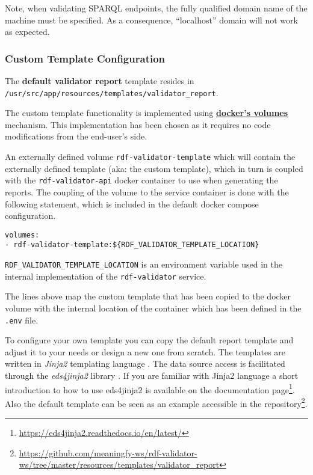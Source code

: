 	Note, when validating SPARQL endpoints, the fully qualified domain name of the machine must be specified. As a consequence, ``localhost'' domain will not work as expected.

	\subsubsection{Custom Template Configuration}
	The \textbf{default validator report} template resides in \\ \texttt{/usr/src/app/resources/templates/validator\_report}.

	The custom template functionality is implemented using \textbf{\href{https://docs.docker.com/storage/volumes/}{docker's volumes}} mechanism. This implementation has been chosen as it requires no code modifications from the end-user's side.
	
	An externally defined volume \texttt{rdf-validator-template} which will contain the externally defined template (aka: the custom template), which in turn is coupled with the \texttt{rdf-validator-api} docker container to use when generating the reports.  The coupling of the volume to the service container is done with the following statement, which is included in the default docker compose configuration. 

	\begin{lstlisting}[]
volumes:
- rdf-validator-template:${RDF_VALIDATOR_TEMPLATE_LOCATION}
	\end{lstlisting}

	\texttt{RDF\_VALIDATOR\_TEMPLATE\_LOCATION} is an environment variable used in the internal implementation of the \texttt{rdf-validator} service.

	The lines above map the custom template that has been copied to the docker volume with the internal location of the container which has been defined in the \texttt{.env} file.
	
	To configure your own template you can copy the default report template and adjust it to your needs or design a new one from scratch. 
	The templates are written in \textit{Jinja2} templating language \citep{jinja2}. The data source access is facilitated through the \textit{eds4jinja2} library \citep{eds4jinja2}. If you are familiar with Jinja2 language a short introduction to how to use eds4jinja2 is available on the documentation page\footnote{\url{https://eds4jinja2.readthedocs.io/en/latest/}}. Also the default template can be seen as an example accessible in the repository\footnote{\url{https://github.com/meaningfy-ws/rdf-validator-ws/tree/master/resources/templates/validator_report}}.
		
